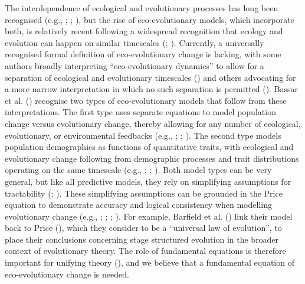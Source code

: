 \documentclass[
]{article}
\begin{document}
The interdependence of ecological and evolutionary processes has long
been recognised (e.g., ;
;
), but the rise of
eco-evolutionary models, which incorporate both, is relatively recent
following a widespread recognition that ecology and evolution can happen
on similar timescales (;
). Currently, a
universally recognised formal definition of eco-evolutionary change is
lacking, with some authors broadly interpreting ``eco-evolutionary
dynamics'' to allow for a separation of ecological and evolutionary
timescales () and others
advocating for a more narrow interpretation in which no such separation
is permitted (). Bassar et
al. () recognise two types of
eco-evolutionary models that follow from these interpretations. The
first type uses separate equations to model population change versus
evolutionary change, thereby allowing for any number of ecological,
evolutionary, or environmental feedbacks (e.g.,
; ; ). The second type
models population demographics as functions of quantitative traits, with
ecological and evolutionary change following from demographic processes
and trait distributions operating on the same timescale (e.g.,
;
;
). Both model types can be
very general, but like all predictive models, they rely on simplifying
assumptions for tractability (;
). These simplifying assumptions can
be grounded in the Price equation to demonstrate accuracy and logical
consistency when modelling evolutionary change (e.g.,
;
;
;
). For example, Barfield et al.
() link their model back to Price
(), which they consider to be a
``universal law of evolution'', to place their conclusions concerning
stage structured evolution in the broader context of evolutionary
theory. The role of fundamental equations is therefore important for
unifying theory (), and we believe
that a fundamental equation of eco-evolutionary change is needed.
\end{document}
